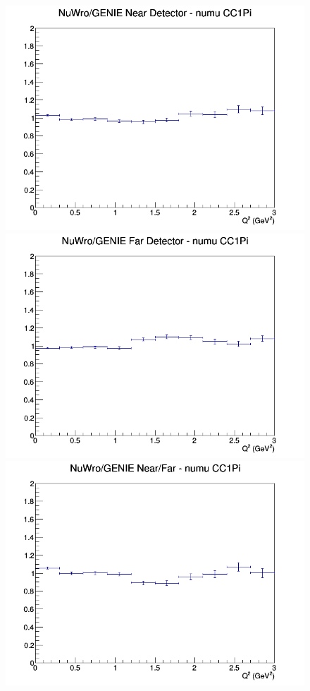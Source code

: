 \documentclass[12pt]{article}
\begin{document}
\begin{figure}[h]
\endminipage
\newline
{}
\includegraphics[width=\linewidth]{eff_Q2/FGT/ratios/CC1Pi_NuWro_GENIE_numu_near_Q2.png}
\endminipage
{}
\includegraphics[width=\linewidth]{eff_Q2/FGT/ratios/CC1Pi_NuWro_GENIE_numu_far_Q2.png}
\endminipage
{}
\includegraphics[width=\linewidth]{eff_Q2/FGT/ratios/CC1Pi_NuWro_GENIE_numu_NF_Q2.png}
\endminipage
\newline
\end{figure}
\clearpage
\end{document}
